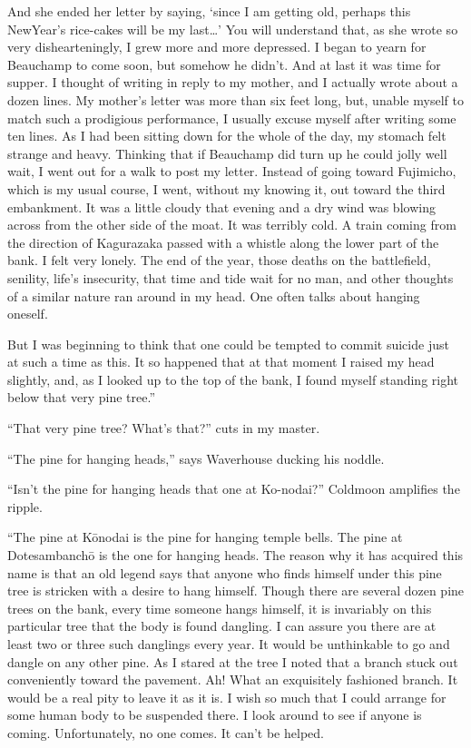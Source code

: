 \documentclass[12pt, openright]{book}
\begin{document}
And she ended her letter by saying, `since I am getting old, perhaps
this NewYear's rice-cakes will be my last\ldots{}' You will understand
that, as she wrote so very dishearteningly, I grew more and more
depressed. I began to yearn for Beauchamp to come soon, but somehow he
didn't. And at last it was time for supper. I thought of writing in
reply to my mother, and I actually wrote about a dozen lines. My
mother's letter was more than six feet long, but, unable myself to match
such a prodigious performance, I usually excuse myself after writing
some ten lines. As I had been sitting down for the whole of the day, my
stomach felt strange and heavy. Thinking that if Beauchamp did turn up
he could jolly well wait, I went out for a walk to post my letter.
Instead of going toward Fujimicho, which is my usual course, I went,
without my knowing it, out toward the third embankment. It was a little
cloudy that evening and a dry wind was blowing across from the other
side of the moat. It was terribly cold. A train coming from the
direction of Kagurazaka passed with a whistle along the lower part of
the bank. I felt very lonely. The end of the year, those deaths on the
battlefield, senility, life's insecurity, that time and tide wait for no
man, and other thoughts of a similar nature ran around in my head. One
often talks about hanging oneself.

But I was beginning to think that one could be tempted to commit suicide
just at such a time as this. It so happened that at that moment I raised
my head slightly, and, as I looked up to the top of the bank, I found
myself standing right below that very pine tree.''

``That very pine tree? What's that?'' cuts in my master.

``The pine for hanging heads,'' says Waverhouse ducking his noddle.

``Isn't the pine for hanging heads that one at Ko-nodai?'' Coldmoon
amplifies the ripple.

``The pine at Kōnodai is the pine for hanging temple bells. The pine at
Dotesambanchō is the one for hanging heads. The reason why it has
acquired this name is that an old legend says that anyone who finds
himself under this pine tree is stricken with a desire to hang himself.
Though there are several dozen pine trees on the bank, every time
someone hangs himself, it is invariably on this particular tree that the
body is found dangling. I can assure you there are at least two or three
such danglings every year. It would be unthinkable to go and dangle on
any other pine. As I stared at the tree I noted that a branch stuck out
conveniently toward the pavement. Ah! What an exquisitely fashioned
branch. It would be a real pity to leave it as it is. I wish so much
that I could arrange for some human body to be suspended there. I look
around to see if anyone is coming. Unfortunately, no one comes. It can't
be helped.
\end{document}
